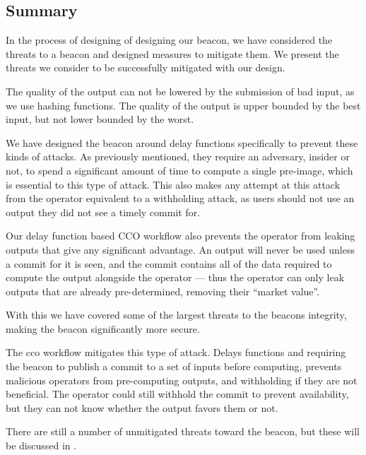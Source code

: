 \subsection{Summary}
In the process of designing of designing our beacon, we have considered the threats to a beacon and designed measures to mitigate them. We present the threats we consider to be successfully mitigated with our design.

The quality of the output can not be lowered by the submission of bad input, as we use hashing functions. The quality of the output is upper bounded by the best input, but not lower bounded by the worst.

We have designed the beacon around delay functions specifically to prevent these kinds of attacks. As previously mentioned, they require an adversary, insider or not, to spend a significant amount of time to compute a single pre-image, which is essential to this type of attack.
This also makes any attempt at this attack from the operator equivalent to a withholding attack, as users should not use an output they did not see a timely commit for.

Our delay function based CCO workflow also prevents the operator from leaking outputs that give any significant advantage. An output will never be used unless a commit for it is seen, and the commit contains all of the data required to compute the output alongside the operator --- thus the operator can only leak outputs that are already pre-determined, removing their \enquote{market value}.

With this we have covered some of the largest threats to the beacons integrity, making the beacon significantly more secure.

The \acrshort{cco} workflow mitigates this type of attack. Delays functions and requiring the beacon to publish a commit to a set of inputs before computing, prevents malicious operators from pre-computing outputs, and withholding if they are not beneficial. The operator could still withhold the commit to prevent availability, but they can not know whether the output favors them or not.

There are still a number of unmitigated threats toward the beacon, but these will be discussed in .